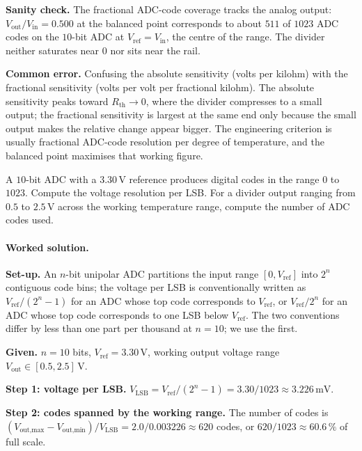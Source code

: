 \textbf{Sanity check.} The fractional ADC-code coverage tracks the
analog output: $V_{\text{out}}/V_{\text{in}} = 0.500$ at the
balanced point corresponds to about $511$ of $1023$ ADC codes on
the $10$-bit ADC at $V_{\text{ref}} = V_{\text{in}}$, the centre
of the range. The divider neither saturates near $0$ nor sits
near the rail.

\textbf{Common error.} Confusing the absolute sensitivity (volts
per kilohm) with the fractional sensitivity (volts per volt per
fractional kilohm). The absolute sensitivity peaks toward
$R_{\text{th}} \to 0$, where the divider compresses to a small
output; the fractional sensitivity is largest at the same end
only because the small output makes the relative change appear
bigger. The engineering criterion is usually fractional ADC-code
resolution per degree of temperature, and the balanced point
maximises that working figure.

\begin{exercise}
A $10$-bit ADC with a $3.30 \,\si{\volt}$ reference produces digital
codes in the range $0$ to $1023$. Compute the voltage resolution per
LSB. For a divider output ranging from $0.5$ to $2.5 \,\si{\volt}$
across the working temperature range, compute the number of ADC
codes used.
\end{exercise}

\paragraph{Worked solution.}
\textbf{Set-up.} An $n$-bit unipolar ADC partitions the input
range $[0, V_{\text{ref}}]$ into $2^{n}$ contiguous code bins;
the voltage per LSB is conventionally written as $V_{\text{ref}}/
(2^{n} - 1)$ for an ADC whose top code corresponds to
$V_{\text{ref}}$, or $V_{\text{ref}}/2^{n}$ for an ADC whose top
code corresponds to one LSB below $V_{\text{ref}}$. The two
conventions differ by less than one part per thousand at
$n = 10$; we use the first.

\textbf{Given.} $n = 10$ bits, $V_{\text{ref}} = 3.30 \,\si
{\volt}$, working output voltage range $V_{\text{out}} \in [0.5,
2.5] \,\si{\volt}$.

\textbf{Step 1: voltage per LSB.}
$V_{\text{LSB}} = V_{\text{ref}}/(2^{n} - 1) = 3.30/1023 \approx
3.226 \,\si{\milli\volt}$.

\textbf{Step 2: codes spanned by the working range.} The number of
codes is $(V_{\text{out,max}} - V_{\text{out,min}})/V_{\text{LSB}}
= 2.0/0.003226 \approx 620$ codes, or $620/1023 \approx 60.6\,\%$
of full scale.


